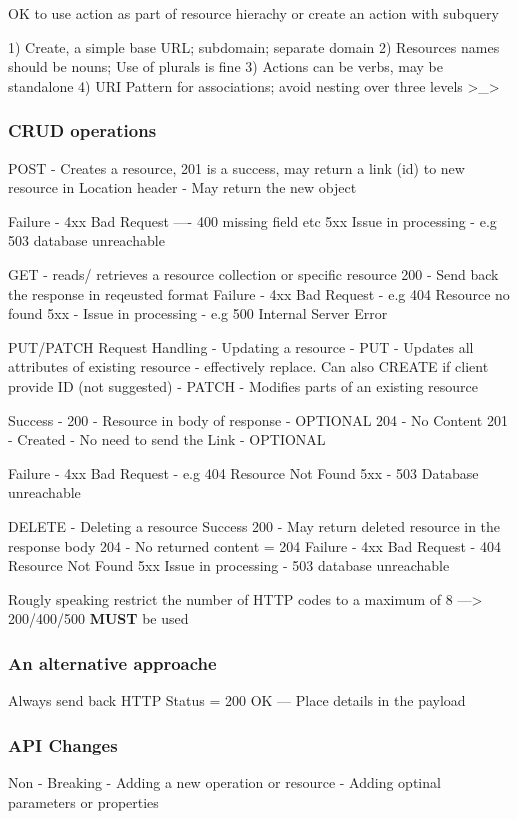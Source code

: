 \documentclass[a4paper, 11pt]{book}
\begin{document}
    OK to use action as part of resource hierachy or create an action with subquery
    
    1) Create, a simple base URL; subdomain; separate domain
    2) Resources names should be nouns; Use of plurals is fine
    3) Actions can be verbs, may be standalone
    4) URI Pattern for associations; avoid nesting over three levels >_>
    
    \subsubsection{CRUD operations}
    POST - Creates a resource,
    201 is a success, may return a link (id) to new resource in Location header
    - May return the new object

    Failure - 4xx Bad Request ---- 400 missing field etc
    5xx Issue in processing - e.g 503 database unreachable

    GET - reads/ retrieves a resource collection or specific resource
    200 - Send back the response in reqeusted format
    Failure - 4xx Bad Request - e.g 404 Resource no found
    5xx - Issue in processing - e.g 500 Internal Server Error

    PUT/PATCH Request Handling - Updating a resource
    - PUT - Updates all attributes of existing resource - effectively replace. Can also CREATE if client provide ID (not suggested)
    - PATCH - Modifies parts of an existing resource

    Success - 200 - Resource in body of response - OPTIONAL
    204 - No Content
    201 - Created - No need to send the Link - OPTIONAL

    Failure - 4xx Bad Request - e.g 404 Resource Not Found
    5xx - 503 Database unreachable

    DELETE - Deleting a resource
    Success 200 - May return deleted resource in the response body
    204 - No returned content = 204
    Failure - 4xx Bad Request - 404 Resource Not Found
    5xx Issue in processing - 503 database unreachable

    Rougly speaking restrict the number of HTTP codes to a maximum of 8
    ---> 200/400/500 \textbf{MUST} be used

    \subsubsection{An alternative approache}
    Always send back HTTP Status = 200 OK
    --- Place details in the payload

    \subsubsection{API Changes}
    Non - Breaking
    - Adding a new operation or resource
    - Adding optinal parameters or properties
\end{document}
